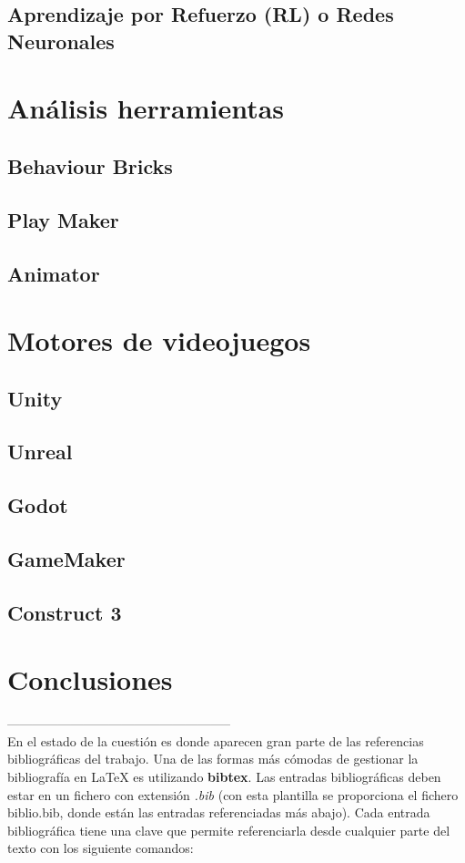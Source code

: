 \subsection{Aprendizaje por Refuerzo (RL) o Redes Neuronales}
\section{Análisis herramientas}
\subsection{Behaviour Bricks}
\subsection{Play Maker}
\subsection{Animator}
\section{Motores de videojuegos}
\subsection{Unity}
\subsection{Unreal}
\subsection{Godot}
\subsection{GameMaker}
\subsection{Construct 3}
\section{Conclusiones}
-----------------------------------------------------\\
En el estado de la cuestión es donde aparecen gran parte de las referencias bibliográficas del trabajo. Una de las formas más cómodas de gestionar la bibliografía en {\LaTeX} es utilizando \textbf{bibtex}. Las entradas bibliográficas deben estar en un fichero con extensión \textit{.bib} (con esta plantilla se proporciona el fichero biblio.bib, donde están las entradas referenciadas más abajo). Cada entrada bibliográfica tiene una clave que permite referenciarla desde cualquier parte del texto con los siguiente comandos:


